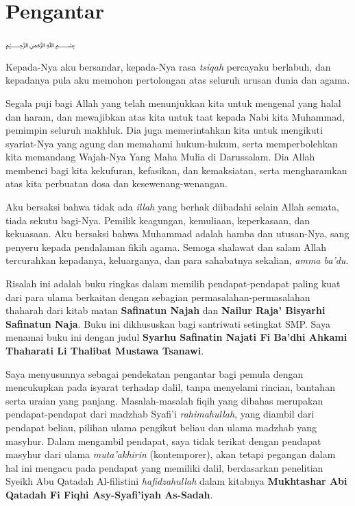 \chapter*{Pengantar}

\begin{center}
\textarabic{﷽}
\end{center}

Kepada-Nya aku bersandar, kepada-Nya rasa \textit{tsiqah} percayaku berlabuh, dan kepadanya pula aku memohon pertolongan atas seluruh urusan dunia dan agama.

Segala puji bagi Allah yang telah menunjukkan kita untuk mengenal yang halal dan haram, dan mewajibkan atas kita untuk taat kepada Nabi kita Muhammad, pemimpin seluruh makhluk. Dia juga memerintahkan kita untuk mengikuti syariat-Nya yang agung dan memahami hukum-hukum, serta memperbolehkan kita memandang Wajah-Nya Yang Maha Mulia di Darussalam. Dia Allah membenci bagi kita kekufuran, kefasikan, dan kemaksiatan, serta mengharamkan atas kita perbuatan dosa dan kesewenang-wenangan.

Aku bersaksi bahwa tidak ada \textit{illah} yang berhak diibadahi selain Allah semata, tiada sekutu bagi-Nya. Pemilik keagungan, kemuliaan, keperkasaan, dan kekuasaan. Aku bersaksi bahwa Muhammad adalah hamba dan utusan-Nya, sang penyeru kepada pendalaman fikih agama. Semoga shalawat dan salam Allah tercurahkan kepadanya, keluarganya, dan para sahabatnya sekalian, \textit{amma ba’du}.

Risalah ini adalah buku ringkas dalam memilih pendapat-pendapat paling kuat dari para ulama berkaitan dengan sebagian permasalahan-permasalahan thaharah dari kitab matan \textbf{Safinatun Najah} dan \textbf{Nailur Raja’ Bisyarhi Safinatun Naja}. Buku ini dikhususkan bagi santriwati setingkat SMP. Saya menamai buku ini dengan judul \textbf{Syarhu Safinatin Najati Fi Ba’dhi Ahkami Thaharati Li Thalibat Mustawa Tsanawi}.

Saya menyusunnya sebagai pendekatan pengantar bagi pemula dengan mencukupkan pada isyarat terhadap dalil, tanpa menyelami rincian, bantahan serta uraian yang panjang. Masalah-masalah fiqih yang dibahas merupakan pendapat-pendapat dari madzhab Syafi’i \textit{rahimahullah}, yang diambil dari pendapat beliau, pilihan ulama pengikut beliau dan ulama madzhab yang masyhur. Dalam mengambil pendapat, saya tidak terikat dengan pendapat masyhur dari ulama \textit{muta’akhirin} (kontemporer), akan tetapi pegangan dalam hal ini mengacu pada pendapat yang memiliki dalil, berdasarkan penelitian Syeikh Abu Qatadah Al-filistini \textit{hafidzahullah} dalam kitabnya \textbf{Mukhtashar Abi Qatadah Fi Fiqhi Asy-Syafi'iyah As-Sadah}.

